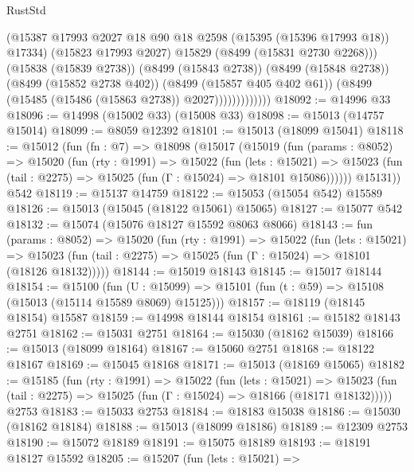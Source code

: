 \begin{lexlean}{RustStd}
\begin{coremodule}
                            (@15387
                              @17993
                              @2027
                              @18
                              @90
                              @18
                              @2598
                              (@15395 (@15396 @17993 @18))
                              @17334)
                            (@15823 @17993 @2027)
                            @15829
                            (@8499 (@15831 @2730 @2268)))
                          (@15838 (@15839 @2738))
                          (@8499 (@15843 @2738))
                          (@8499 (@15848 @2738))
                          (@8499 (@15852 @2738 @402))
                          (@8499 (@15857 @405 @402 @61))
                          (@8499 (@15485 (@15486 (@15863 @2738)) @2027)))))))))))))
@18092 := @14996 @33
@18096 := @14998 (@15002 @33) (@15008 @33)
@18098 := @15013 (@14757 @15014)
@18099 := @8059 @12392
@18101 := @15013 (@18099 @15041)
@18118 := @15012
    (fun (fn : @7) =>
    @18098
      (@15017
        (@15019
          (fun (params : @8052) =>
          @15020
            (fun (rty : @1991) =>
            @15022
              (fun (lets : @15021) =>
              @15023 (fun (tail : @2275) => @15025 (fun (Γ : @15024) => @18101 @15086))))))
        @15131))
    @542
@18119 := @15137 @14759
@18122 := @15053 (@15054 @542) @15589
@18126 := @15013 (@15045 (@18122 @15061) @15065)
@18127 := @15077 @542
@18132 := @15074 (@15076 @18127 @15592 @8063 @8066)
@18143 := fun (params : @8052) =>
  @15020
    (fun (rty : @1991) =>
    @15022
      (fun (lets : @15021) =>
      @15023 (fun (tail : @2275) => @15025 (fun (Γ : @15024) => @18101 (@18126 @18132)))))
@18144 := @15019 @18143
@18145 := @15017 @18144
@18154 := @15100
    (fun (U : @15099) => @15101 (fun (t : @59) => @15108 (@15013 (@15114 @15589 @8069) @15125)))
@18157 := @18119 (@18145 @18154) @15587
@18159 := @14998 @18144 @18154
@18161 := @15182 @18143 @2751
@18162 := @15031 @2751
@18164 := @15030 (@18162 @15039)
@18166 := @15013 (@18099 @18164)
@18167 := @15060 @2751
@18168 := @18122 @18167
@18169 := @15045 @18168
@18171 := @15013 (@18169 @15065)
@18182 := @15185
    (fun (rty : @1991) =>
    @15022
      (fun (lets : @15021) =>
      @15023 (fun (tail : @2275) => @15025 (fun (Γ : @15024) => @18166 (@18171 @18132)))))
    @2753
@18183 := @15033 @2753
@18184 := @18183 @15038
@18186 := @15030 (@18162 @18184)
@18188 := @15013 (@18099 @18186)
@18189 := @12309 @2753
@18190 := @15072 @18189
@18191 := @15075 @18189
@18193 := @18191 @18127 @15592
@18205 := @15207
    (fun (lets : @15021) =>

\end{coremodule}
\end{lexlean}
